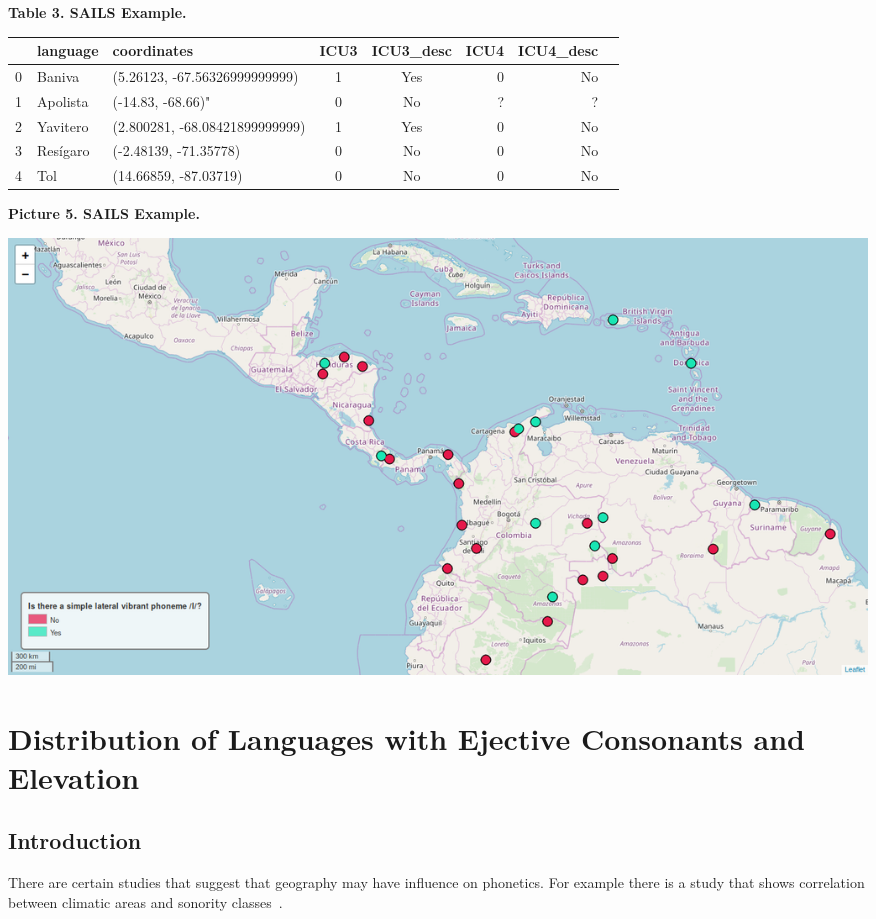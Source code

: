\documentclass[a4paper,12pt]{article}
\begin{document}
\textbf{Table 3. SAILS Example.}

\begin{adjustbox}{max width=\textwidth}
\begin{tabular}{ l | l | l | c | c | r | r | r }
    ~ & language & coordinates & ICU3 & ICU3\_desc & ICU4 & ICU4\_desc \\
    \hline
    0 & Baniva & (5.26123, -67.56326999999999) & 1 & Yes & 0 & No \\
    1 & Apolista & (-14.83, -68.66)" & 0 & No & ? & ? \\
    2 & Yavitero & (2.800281, -68.08421899999999) & 1 & Yes & 0 & No \\
    3 & Resígaro & (-2.48139, -71.35778) & 0 & No & 0 & No \\
    4 & Tol & (14.66859,  -87.03719) & 0 & No & 0 & No \\
\end{tabular}
\end{adjustbox}

\bigskip

\begin{samepage}
\textbf{Picture 5. SAILS Example.}\nopagebreak

\includegraphics[width=\textwidth]{images/sails.png}
\end{samepage}

\newpage

\section{Distribution of Languages with Ejective Consonants and Elevation}

\subsection{Introduction}

There are certain studies that suggest that geography may have influence on phonetics. For example there is a study that shows correlation between climatic areas and sonority classes~\parencite{climatesSonorants}.
\end{document}
